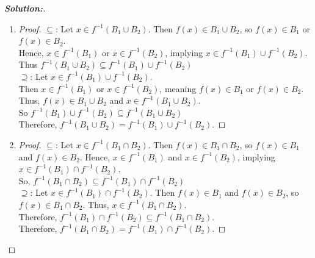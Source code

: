 \documentclass[12pt]{article}
\theoremstyle{definition}\newtheorem{problem}{Problem}
\newenvironment{solution}{\begin{proof}[\bfseries\textup{Solution:}]}{\end{proof}}
\begin{document}
\begin{solution}
\begin{enumerate}
\begin{proof}
            Therefore, \( f(A_1 \cap A_2) \subseteq f(A_1) \cap f(A_2) \).
        \end{proof}  
        \bigbreak
        \item 
        
        \begin{proof}
            \(\subseteq\): Let \( x \in f^{-1}(B_1 \cup B_2) \). Then \( f(x) \in B_1 \cup B_2 \), so \( f(x) \in B_1 \) or \( f(x) \in B_2 \). \\
            Hence, \( x \in f^{-1}(B_1) \) or \( x \in f^{-1}(B_2) \), implying \( x \in f^{-1}(B_1) \cup f^{-1}(B_2) \).\\
            Thus $ f^{-1} (B_1 \cup B_2) \subseteq f^{-1}(B_1) \cup f^{-1}(B_2) $ \\

            \(\supseteq\): Let \( x \in f^{-1}(B_1) \cup f^{-1}(B_2) \). \\
            Then \( x \in f^{-1}(B_1) \) or \( x \in f^{-1}(B_2) \), meaning \( f(x) \in B_1 \) or \( f(x) \in B_2 \). \\
            Thus, \( f(x) \in B_1 \cup B_2 \) and \( x \in f^{-1}(B_1 \cup B_2) \).\\
            So $ f^{-1}(B_1) \cup f^{-1}(B_2) \subseteq f^{-1} (B_1 \cup B_2)   $ \\
            Therefore, \( f^{-1}(B_1 \cup B_2) = f^{-1}(B_1) \cup f^{-1}(B_2) \).
        \end{proof}
        
        \bigbreak
        \item 
        
        \begin{proof}
            \(\subseteq\): Let \( x \in f^{-1}(B_1 \cap B_2) \). Then \( f(x) \in B_1 \cap B_2 \), so \( f(x) \in B_1 \) and \( f(x) \in B_2 \). Hence, \( x \in f^{-1}(B_1) \) and \( x \in f^{-1}(B_2) \), implying \( x \in f^{-1}(B_1) \cap f^{-1}(B_2) \).\\
            So, \( f^{-1}(B_1 \cap B_2) \subseteq  f^{-1}(B_1) \cap f^{-1}(B_2) \)\\

            \(\supseteq\): Let \( x \in f^{-1}(B_1) \cap f^{-1}(B_2) \). Then \( f(x) \in B_1 \) and \( f(x) \in B_2 \), so \( f(x) \in B_1 \cap B_2 \). Thus, \( x \in f^{-1}(B_1 \cap B_2) \).\\
            Therefore, \( f^{-1}(B_1) \cap f^{-1}(B_2) \subseteq f^{-1}(B_1 \cap B_2) \).\\
            
            Therefore, \( f^{-1}(B_1 \cap B_2) = f^{-1}(B_1) \cap f^{-1}(B_2) \).
        \end{proof}
    \end{enumerate}
    
\end{solution}
\end{document}

